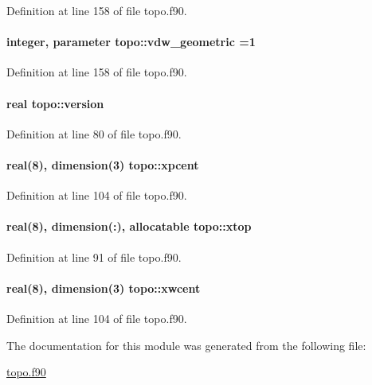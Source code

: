 Definition at line 158 of file topo.\-f90.

\hypertarget{classtopo_a7c8bd17bbabb36ba8f438e50e503d6b7}{
\paragraph[{vdw\-\_\-geometric}]{\setlength{\rightskip}{0pt plus 5cm}integer, parameter topo\-::vdw\-\_\-geometric =1}}\label{classtopo_a7c8bd17bbabb36ba8f438e50e503d6b7}


Definition at line 158 of file topo.\-f90.

\hypertarget{classtopo_a617c819365f4a269fda75bb3a4e3829e}{
\paragraph[{version}]{\setlength{\rightskip}{0pt plus 5cm}real topo\-::version}}\label{classtopo_a617c819365f4a269fda75bb3a4e3829e}


Definition at line 80 of file topo.\-f90.

\hypertarget{classtopo_a05520e487814783f2383d15af85fa9b0}{
\paragraph[{xpcent}]{\setlength{\rightskip}{0pt plus 5cm}real(8), dimension(3) topo\-::xpcent}}\label{classtopo_a05520e487814783f2383d15af85fa9b0}


Definition at line 104 of file topo.\-f90.

\hypertarget{classtopo_a401594110af6e631225453a47e150299}{
\paragraph[{xtop}]{\setlength{\rightskip}{0pt plus 5cm}real(8), dimension(\-:), allocatable topo\-::xtop}}\label{classtopo_a401594110af6e631225453a47e150299}


Definition at line 91 of file topo.\-f90.

\hypertarget{classtopo_a6d9dae4d1a043949c4aaed1b7e605fb1}{
\paragraph[{xwcent}]{\setlength{\rightskip}{0pt plus 5cm}real(8), dimension(3) topo\-::xwcent}}\label{classtopo_a6d9dae4d1a043949c4aaed1b7e605fb1}


Definition at line 104 of file topo.\-f90.



The documentation for this module was generated from the following file\-:\begin{DoxyCompactItemize}
\item 
\hyperlink{topo_8f90}{topo.\-f90}\end{DoxyCompactItemize}
